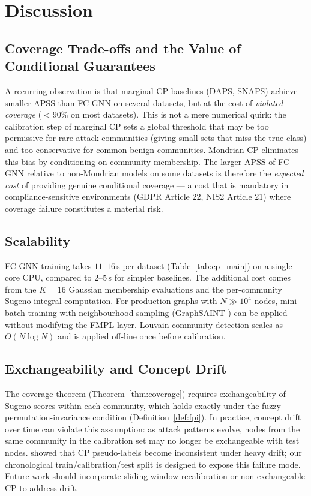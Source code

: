 \section{Discussion}
\label{sec:discussion}

\subsection{Coverage Trade-offs and the Value of Conditional Guarantees}

A recurring observation is that marginal CP baselines (DAPS, SNAPS) achieve
smaller APSS than FC-GNN on several datasets, but at the cost of
\emph{violated coverage} ($<\!90\%$ on most datasets).
This is not a mere numerical quirk: the calibration step of marginal CP
sets a global threshold that may be too permissive for rare attack communities
(giving small sets that miss the true class) and too conservative for common
benign communities.
Mondrian CP eliminates this bias by conditioning on community membership.
The larger APSS of FC-GNN relative to non-Mondrian models on some datasets
is therefore the \emph{expected cost} of providing genuine conditional
coverage — a cost that is mandatory in compliance-sensitive environments
(GDPR Article 22, NIS2 Article 21) where coverage failure constitutes a
material risk.

\subsection{Scalability}

FC-GNN training takes $11$--$16$\,s per dataset (Table~\ref{tab:cp_main})
on a single-core CPU, compared to $2$--$5$\,s for simpler baselines.
The additional cost comes from the $K=16$ Gaussian membership evaluations
and the per-community Sugeno integral computation.
For production graphs with $N \gg 10^4$ nodes, mini-batch training with
neighbourhood sampling (GraphSAINT \citep{zeng20}) can be applied without
modifying the FMPL layer.
Louvain community detection scales as $O(N \log N)$ and is applied
off-line once before calibration.

\subsection{Exchangeability and Concept Drift}

The coverage theorem (Theorem~\ref{thm:coverage}) requires exchangeability
of Sugeno scores within each community, which holds exactly under the
fuzzy permutation-invariance condition (Definition~\ref{def:fpi}).
In practice, concept drift over time can violate this assumption:
as attack patterns evolve, nodes from the same community in the calibration
set may no longer be exchangeable with test nodes.
\citet{cp_drift} showed that CP pseudo-labels become inconsistent under
heavy drift; our chronological train/calibration/test split is designed to
expose this failure mode.
Future work should incorporate sliding-window recalibration
\citep{cp_cps26} or non-exchangeable CP \citep{ncpnet25} to address drift.

